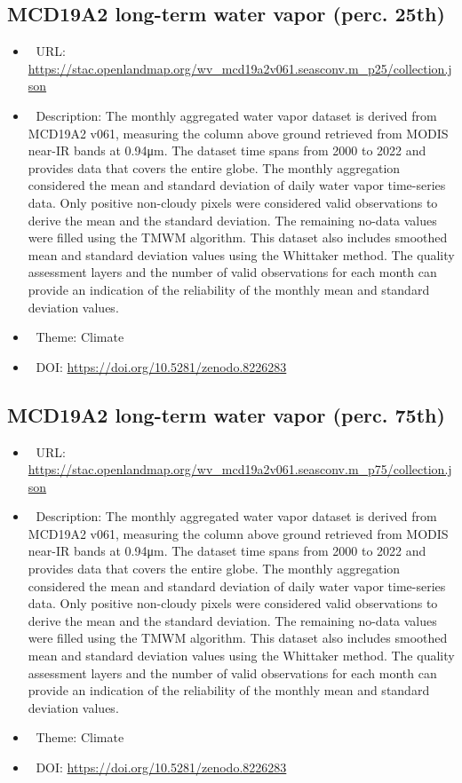 \documentclass[
  graybox,natbib,nospthms]{svmono}
\providecommand{\tightlist}{%
  \setlength{\itemsep}{0pt}\setlength{\parskip}{0pt}}
\providecommand{\tightlist}{\setlength{\itemsep}{0pt}\setlength{\parskip}{0pt}}
\begin{document}
\hypertarget{mcd19a2-long-term-water-vapor-perc.-25th}{%
\subsection{MCD19A2 long-term water vapor (perc. 25th)}\label{mcd19a2-long-term-water-vapor-perc.-25th}}

\begin{itemize}
\tightlist
\item
  🔗 URL: \url{https://stac.openlandmap.org/wv_mcd19a2v061.seasconv.m_p25/collection.json}
\item
  📰 Description: The monthly aggregated water vapor dataset is derived from MCD19A2 v061, measuring the column above ground retrieved from MODIS near-IR bands at 0.94μm. The dataset time spans from 2000 to 2022 and provides data that covers the entire globe. The monthly aggregation considered the mean and standard deviation of daily water vapor time-series data. Only positive non-cloudy pixels were considered valid observations to derive the mean and the standard deviation. The remaining no-data values were filled using the TMWM algorithm. This dataset also includes smoothed mean and standard deviation values using the Whittaker method. The quality assessment layers and the number of valid observations for each month can provide an indication of the reliability of the monthly mean and standard deviation values.
\item
  📝 Theme: Climate
\item
  📂 DOI: \url{https://doi.org/10.5281/zenodo.8226283}
\end{itemize}

\hypertarget{mcd19a2-long-term-water-vapor-perc.-75th}{%
\subsection{MCD19A2 long-term water vapor (perc. 75th)}\label{mcd19a2-long-term-water-vapor-perc.-75th}}

\begin{itemize}
\tightlist
\item
  🔗 URL: \url{https://stac.openlandmap.org/wv_mcd19a2v061.seasconv.m_p75/collection.json}
\item
  📰 Description: The monthly aggregated water vapor dataset is derived from MCD19A2 v061, measuring the column above ground retrieved from MODIS near-IR bands at 0.94μm. The dataset time spans from 2000 to 2022 and provides data that covers the entire globe. The monthly aggregation considered the mean and standard deviation of daily water vapor time-series data. Only positive non-cloudy pixels were considered valid observations to derive the mean and the standard deviation. The remaining no-data values were filled using the TMWM algorithm. This dataset also includes smoothed mean and standard deviation values using the Whittaker method. The quality assessment layers and the number of valid observations for each month can provide an indication of the reliability of the monthly mean and standard deviation values.
\item
  📝 Theme: Climate
\item
  📂 DOI: \url{https://doi.org/10.5281/zenodo.8226283}
\end{itemize}
\end{document}
